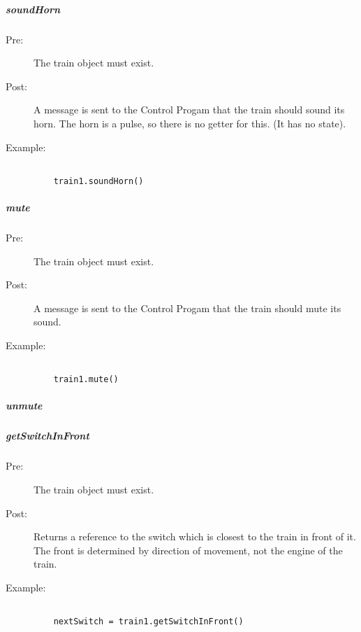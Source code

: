 \documentclass[a4paper,11pt,notitlepage]{article}
\def\CS{Control Progam\xspace}
\begin{document}
\subparagraph{soundHorn} 
\begin{description}
\item[\hspace{1cm}Pre:] The train object must exist. 
\item[\hspace{1cm}Post:] A message is sent to the \CS that the train should sound its horn. The horn is a pulse, so there is no getter for this. (It has no state).
\item[\hspace{1cm}Example:]
\begin{verbatim}

    train1.soundHorn()
\end{verbatim}
\end{description}

\subparagraph{mute} 
\begin{description}
\item[\hspace{1cm}Pre:] The train object must exist. 
\item[\hspace{1cm}Post:] A message is sent to the \CS that the train should mute its sound.
\item[\hspace{1cm}Example:]
\begin{verbatim}

    train1.mute()
\end{verbatim}
\end{description}

\subparagraph{unmute} 

\subparagraph{getSwitchInFront} 
\begin{description}
\item[\hspace{1cm}Pre:] The train object must exist. 
\item[\hspace{1cm}Post:] Returns a reference to the switch which is closest to the train in front of it. The front is determined by direction of movement, not the engine of the train.
\item[\hspace{1cm}Example:]
\begin{verbatim}

    nextSwitch = train1.getSwitchInFront()
\end{verbatim}
\end{description}
\end{document}
